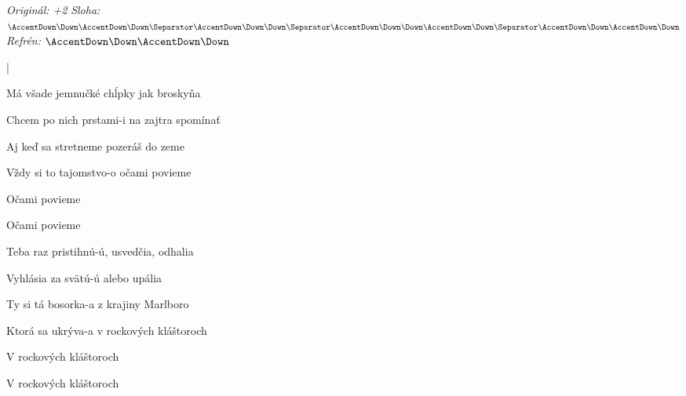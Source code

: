 \begin{song}


\begin{headerbox}
\RaiseBoxWithAccents
\textit{Originál: +2} \quad
\textit{Sloha:} $\AccentDown\Down\AccentDown\Down \Separator \AccentDown\Down\Down \Separator \AccentDown\Down\Down\AccentDown\Down \Separator \AccentDown\Down\AccentDown\Down$ \quad
\textit{Refrén:} $\AccentDown\Down\AccentDown\Down$
\end{headerbox}

\begin{hchordbox}
\end{hchordbox}

\large

\bigskip

\Intro {}    |      \par

\bigskip

 Má všade jemnučké  chĺpky jak broskyňa \par
{} Chcem po nich prstami-i na zajtra spomínať \par
{} Aj keď sa stretneme  pozeráš do zeme \par
{} Vždy si to tajomstvo-o očami povieme \par
{}   Očami povieme \par
{}   Očami povieme \par

\bigskip

 Teba raz pristihnú-ú, usvedčia, odhalia \par
{} Vyhlásia za svätú-ú alebo upália \par
{} Ty si tá bosorka-a z krajiny Marlboro \par
{} Ktorá sa ukrýva-a v rockových kláštoroch \par
{}   V rockových kláštoroch \par
{}   V rockových kláštoroch \par


\end{song}
